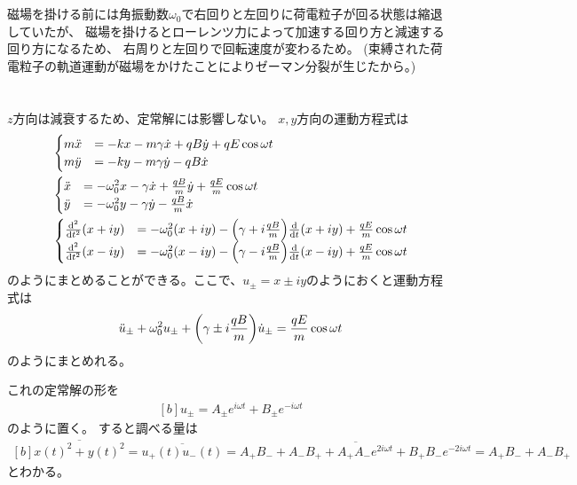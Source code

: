 \documentclass[../ap_2011.tex]{subfiles}
\begin{document}
\section{}
磁場を掛ける前には角振動数\(\omega_0\)で右回りと左回りに荷電粒子が回る状態は縮退していたが、
磁場を掛けるとローレンツ力によって加速する回り方と減速する回り方になるため、
右周りと左回りで回転速度が変わるため。
(束縛された荷電粒子の軌道運動が磁場をかけたことによりゼーマン分裂が生じたから。)

\section{}
\(z\)方向は減衰するため、定常解には影響しない。
\(x,y\)方向の運動方程式は
\begin{equation}\begin{aligned}[b]
    &\begin{cases}
        m\ddot{x} &= -kx -m\gamma\dot{x} +qB\dot{y}+qE\cos\omega t\\
        m\ddot{y} &= -ky -m\gamma\dot{y} -qB\dot{x}
    \end{cases}\\
    &\begin{cases}
        \ddot{x} &= -\omega_0^2x -\gamma\dot{x} +\frac{qB}{m}\dot{y}+\frac{qE}{m}\cos\omega t\\
        \ddot{y} &= -\omega_0^2 y -\gamma\dot{y} -\frac{qB}{m}\dot{x}
    \end{cases}\\
    &\begin{cases}
        \dv[2]{t}(x+iy) &= -\omega_0^2(x+iy) -\qty(\gamma+i\frac{qB}{m})\dv{t}(x+iy)+\frac{qE}{m}\cos\omega t\\
        \dv[2]{t}(x-iy) &= -\omega_0^2(x-iy) -\qty(\gamma-i\frac{qB}{m})\dv{t}(x-iy)+\frac{qE}{m}\cos\omega t
    \end{cases}
\end{aligned}\end{equation}
のようにまとめることができる。ここで、\(u_\pm=x\pm iy\)のようにおくと運動方程式は
\begin{equation}\begin{aligned}[b]
    \ddot{u}_\pm +\omega_0^2u_\pm +\qty(\gamma\pm i\frac{qB}{m})\dot{u}_\pm =\frac{qE}{m}\cos\omega t
\end{aligned}\end{equation}
のようにまとめれる。

これの定常解の形を
\begin{equation}\begin{aligned}[b]
    u_{\pm} = A_{\pm}e^{i\omega t}+B_{\pm}e^{-i\omega t}
\end{aligned}\end{equation}
のように置く。
すると調べる量は
\begin{equation}\begin{aligned}[b]
    \overline{x(t)^2+y(t)^2}
    =\overline{u_+(t)u_-(t)}
    =\overline{A_+B_- +A_-B_+ + A_+A_-e^{2i\omega t} +B_+B_- e^{-2i\omega t}}
    =A_+B_- +A_-B_+
\end{aligned}\end{equation}
とわかる。
\end{document}
